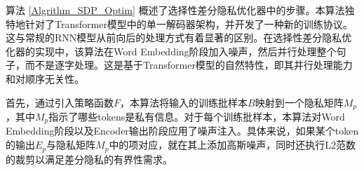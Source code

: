 %

%

算法 \ref{Algrithm_SDP_Optim} 概述了选择性差分隐私优化器中的步骤。本算法独特地针对了Transformer模型中的单一解码器架构，并开发了一种新的训练协议。这与常规的RNN模型从前向后的处理方式有着显著的区别。在选择性差分隐私优化器的实现中，该算法在Word Embedding阶段加入噪声，然后并行处理整个句子，而不是逐字处理。这是基于Transformer模型的自然特性，即其并行处理能力和对顺序无关性。

首先，通过引入策略函数$F$，本算法将输入的训练批样本$B$映射到一个隐私矩阵$M_p$，其中$M_p$指示了哪些tokens是私有信息。对于每个训练批样本，本算法对Word Embedding阶段以及Encoder输出阶段应用了噪声注入。具体来说，如果某个token的输出$E_p$与隐私矩阵$M_p$中的项对应，就在其上添加高斯噪声，同时还执行L2范数的裁剪以满足差分隐私的有界性需求。

